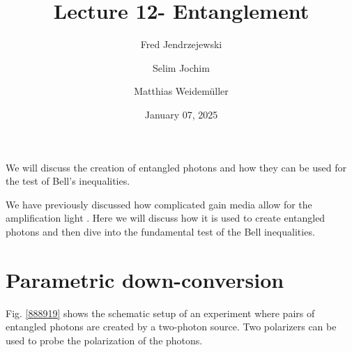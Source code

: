 \documentclass[10pt]{article}
\let\cite\citep
\renewenvironment{abstract}
  {{\bfseries\noindent{\abstractname}\par\nobreak}\footnotesize}
  {\bigskip}
\providecommand\citep{\cite}
\begin{document}
\title{Lecture 12- Entanglement}



\author[1]{Fred Jendrzejewski}%
\author[2]{Selim Jochim}%
\author[2]{Matthias Weidemüller}%
%
%


\vspace{-1em}



  
  \date{January 07, 2025}


\begingroup
\let\center\flushleft
\let\endcenter\endflushleft
\maketitle
\endgroup





\begin{abstract}
We will discuss the creation of entangled photons and how they can be used for the test of Bell's inequalities.%
\end{abstract}%



\sloppy


We have previously discussed how complicated gain media allow for the amplification light \cite{Jendrzejewski}. Here we will discuss how it is used to create entangled photons and then dive into the fundamental test of the Bell inequalities.

\section{Parametric down-conversion}

Fig. \ref{888919} shows the schematic setup of an experiment where pairs of entangled photons are created by a two-photon source. Two polarizers can be used to probe the polarization of the photons.
\end{document}
